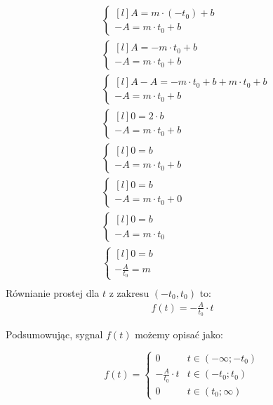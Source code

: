 \begin{task}
\begin{align*}
&\left\{\begin{matrix*}[l]
A = m\cdot (-t_{0}) +b\\ 
-A = m\cdot t_0 +b
\end{matrix*}\right. \\
&\left\{\begin{matrix*}[l]
A = -m\cdot t_{0} +b\\ 
-A = m\cdot t_0 +b
\end{matrix*}\right. \\
&\left\{\begin{matrix*}[l]
A-A = -m\cdot t_{0} +b + m\cdot t_0 +b\\ 
-A = m\cdot t_0 +b
\end{matrix*}\right. \\
&\left\{\begin{matrix*}[l]
 0 = 2 \cdot b\\ 
-A = m\cdot t_0 +b
\end{matrix*}\right. \\
&\left\{\begin{matrix*}[l]
0 = b\\ 
-A = m\cdot t_0 +b
\end{matrix*}\right. \\
&\left\{\begin{matrix*}[l]
0 = b\\ 
-A = m\cdot t_0 +0
\end{matrix*}\right. \\
&\left\{\begin{matrix*}[l]
0 = b\\ 
-A = m\cdot t_0
\end{matrix*}\right. \\
&\left\{\begin{matrix*}[l]
0 = b\\ 
-\frac{A}{t_0} = m
\end{matrix*}\right. \\
\end{align*}
Równianie prostej dla $t$ z zakresu  $(-t_{0},t_0)$ to:
\begin{align*}
f(t) = -\frac{A}{t_{0}}\cdot t
\end{align*}

Podsumowując, sygnal $f(t)$ możemy opisać jako:

\begin{equation}
f(t)=\begin{cases}
0 & t \in \left( -\infty; -t_0 \right ) \\
-\frac{A}{t_{0}}\cdot t & t \in \left( -t_0; t_0 \right ) \\
0 & t \in \left( t_0; \infty \right )
\end{cases} 
\end{equation}


\end{task}
